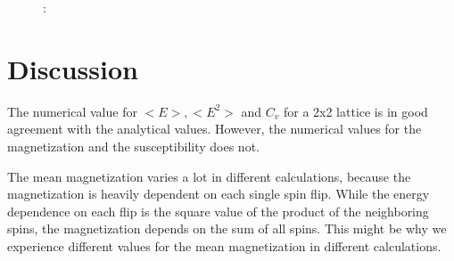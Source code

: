 \documentclass{article}
\begin{document}
{{\begin{figure}[H]
\caption{:}
\label{fig:susc_cap}
\end{figure}


\section{Discussion}


	The numerical value for $<E>, <E^2>$ and $C_v$ for a 2x2 lattice is in good agreement with the analytical values. However, the numerical values for the magnetization and the susceptibility does not.

	The mean magnetization varies a lot in different calculations, because the magnetization is heavily dependent on each single spin flip. While the energy dependence on each flip is the square value of the product of the neighboring spins, the magnetization depends on the sum of all spins. This might be why we experience different values for the mean magnetization in different calculations.

}}
\end{document}
